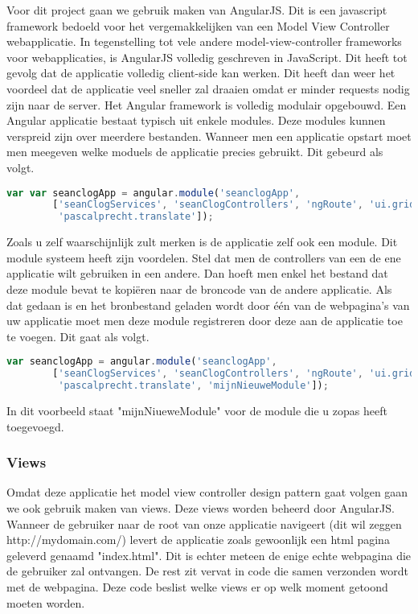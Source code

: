 \documentclass[a4paper,11pt]{article}
\begin{document}
Voor dit project gaan we gebruik maken van AngularJS. Dit is een javascript framework bedoeld voor het vergemakkelijken van een Model View Controller webapplicatie. In tegenstelling tot vele andere model-view-controller frameworks voor webapplicaties, is AngularJS volledig geschreven in JavaScript. Dit heeft tot gevolg dat de applicatie volledig client-side kan werken. Dit heeft dan weer het voordeel dat de applicatie veel sneller zal draaien omdat er minder requests nodig zijn naar de server. Het Angular framework is volledig modulair opgebouwd. Een Angular applicatie bestaat typisch uit enkele modules. Deze modules kunnen verspreid zijn over meerdere bestanden. Wanneer men een applicatie opstart moet men meegeven welke moduels de applicatie precies gebruikt. Dit gebeurd als volgt.

\begin{lstlisting}[language=javascript]
var var seanclogApp = angular.module('seanclogApp',
		['seanClogServices', 'seanClogControllers', 'ngRoute', 'ui.grid',
		 'pascalprecht.translate']);
\end{lstlisting}

Zoals u zelf waarschijnlijk zult merken is de applicatie zelf ook een module. Dit module systeem heeft zijn voordelen. Stel dat men de controllers van een de ene applicatie wilt gebruiken in een andere. Dan hoeft men enkel het bestand dat deze module bevat te kopiëren naar de broncode van de andere applicatie. Als dat gedaan is en het bronbestand geladen wordt door één van de webpagina's van uw applicatie moet men deze module registreren door deze aan de applicatie toe te voegen. Dit gaat als volgt.

\begin{lstlisting}[language=javascript]
var seanclogApp = angular.module('seanclogApp',
		['seanClogServices', 'seanClogControllers', 'ngRoute', 'ui.grid',
		 'pascalprecht.translate', 'mijnNieuweModule']);
\end{lstlisting}

In dit voorbeeld staat "mijnNiueweModule" voor de module die u zopas heeft toegevoegd.

\subsubsection{Views}
Omdat deze applicatie het model view controller design pattern gaat volgen gaan we ook gebruik maken van views. Deze views worden beheerd door AngularJS. Wanneer de gebruiker naar de root van onze applicatie navigeert (dit wil zeggen http://mydomain.com/) levert de applicatie zoals gewoonlijk een html pagina geleverd genaamd "index.html". Dit is echter meteen de enige echte webpagina die de gebruiker zal ontvangen. De rest zit vervat in code die samen verzonden wordt met de webpagina. Deze code beslist welke views er op welk moment getoond moeten worden.
\end{document}
